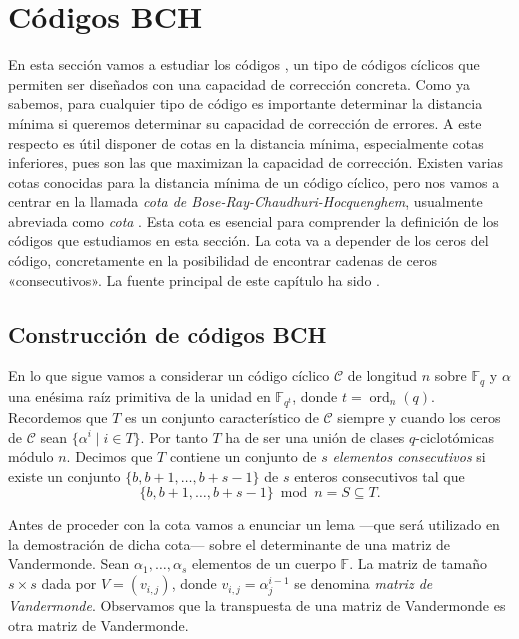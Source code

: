 

\chapter{Códigos BCH}


En esta sección vamos a estudiar los códigos , un tipo de códigos cíclicos que permiten ser diseñados con una capacidad de corrección concreta.
Como ya sabemos, para cualquier tipo de código es importante determinar la distancia mínima si queremos determinar su capacidad de corrección de errores.
A este respecto es útil disponer de cotas en la distancia mínima, especialmente cotas inferiores, pues son las que maximizan la capacidad de corrección.
Existen varias cotas conocidas para la distancia mínima de un código cíclico, pero nos vamos a centrar en la llamada \textit{cota de Bose-Ray-Chaudhuri-Hocquenghem}, usualmente abreviada como \textit{cota }.
Esta cota es esencial para comprender la definición de los códigos  que estudiamos en esta sección.
La cota  va a depender de los ceros del código, concretamente en la posibilidad de encontrar cadenas de ceros «consecutivos».
La fuente principal de este capítulo ha sido \parencite{huffman_fundamentals_2003}.

\section{Construcción de códigos BCH}

En lo que sigue vamos a considerar un código cíclico \(\mathcal C\)  de longitud \(n\) sobre \(\mathbb F_q\) y \(\alpha\) una enésima raíz primitiva de la unidad en \(\mathbb F_{q^t}\), donde \(t = \operatorname{ord}_n(q)\).
Recordemos que \(T\) es un conjunto característico de \(\mathcal C\) siempre y cuando los ceros de \(\mathcal C\) sean \(\{\alpha^{i} \mid i \in T\}\).
Por tanto \(T\) ha de ser una unión de clases \(q\)-ciclotómicas módulo \(n\).
Decimos que \(T\) contiene un conjunto de \(s\) \textit{elementos consecutivos} si existe un conjunto \(\{b, b + 1, \dots, b + s - 1\}\) de \(s\) enteros consecutivos tal que
\[
  \{b, b + 1, \dots, b + s - 1\} \bmod n = S \subseteq T.
\]

Antes de proceder con la cota  vamos a enunciar un lema —que será utilizado en la demostración de dicha cota— sobre el determinante de una matriz de Vandermonde.
Sean \(\alpha_1, \dots, \alpha_s\) elementos de un cuerpo \(\mathbb F\).
La matriz de tamaño \(s \times s\) dada por \(V = (v_{i, j})\), donde \(v_{i,j} = \alpha_{j}^{i-1}\) se denomina \textit{matriz de Vandermonde}.
Observamos que la transpuesta de una matriz de Vandermonde es otra matriz de Vandermonde.

